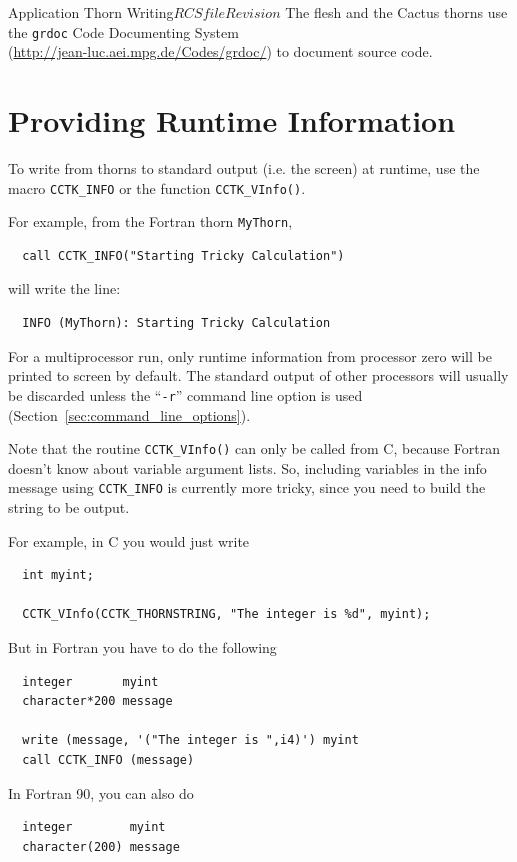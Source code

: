 \begin{cactuspart}{Application Thorn Writing}{$RCSfile$}{$Revision$}
The flesh and the Cactus thorns use the \texttt{grdoc} Code Documenting
System\\(\url{http://jean-luc.aei.mpg.de/Codes/grdoc/}) to document
source code.


\section{Providing Runtime Information}
\label{sec:prrutiin}

To write from thorns to standard output (i.e. the screen)
at runtime, use the macro \texttt{CCTK\_INFO} or the function \texttt{CCTK\_VInfo()}.

For example, from the Fortran thorn \texttt{MyThorn},
\begin{verbatim}
  call CCTK_INFO("Starting Tricky Calculation")
\end{verbatim}
%
will write the line:
\begin{verbatim}
  INFO (MyThorn): Starting Tricky Calculation
\end{verbatim}

For a multiprocessor run, only runtime information from processor zero
will be printed to screen by default. The standard output of other processors
will usually be discarded unless the ``\texttt{-r}'' command line option is used
(Section~\ref{sec:command_line_options}).

Note that the routine \texttt{CCTK\_VInfo()} can only be called from C, because
Fortran doesn't know about variable argument lists. So, including variables in
the info message using \texttt{CCTK\_INFO} is currently more tricky, since you
need to build the string to be output.

For example, in C you would just write
\begin{verbatim}
  int myint;

  CCTK_VInfo(CCTK_THORNSTRING, "The integer is %d", myint);
\end{verbatim}

But in Fortran you have to do the following
\begin{verbatim}
  integer       myint
  character*200 message

  write (message, '("The integer is ",i4)') myint
  call CCTK_INFO (message)
\end{verbatim}

In Fortran 90, you can also do
\begin{verbatim}
  integer        myint
  character(200) message


\end{verbatim}
\end{cactuspart}

